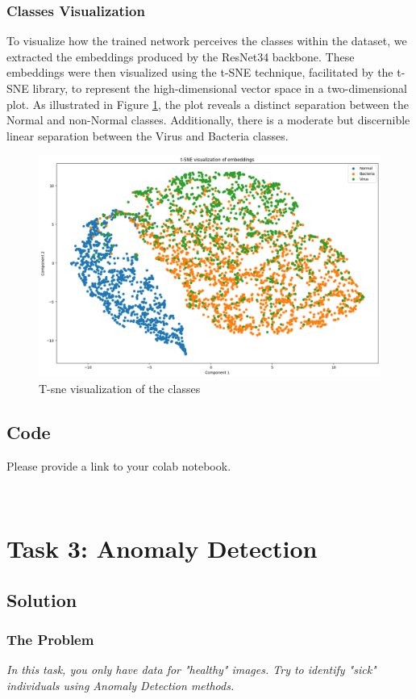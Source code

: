 \documentclass{article}
\begin{document}
\subsubsection{Classes Visualization}
To visualize how the trained network perceives the classes within the dataset, we extracted the embeddings produced by the ResNet34 backbone. These embeddings were then visualized using the t-SNE technique, facilitated by the t-SNE library, to represent the high-dimensional vector space in a two-dimensional plot. As illustrated in Figure \ref{fig:t_sne_1b}, the plot reveals a distinct separation between the Normal and non-Normal classes. Additionally, there is a moderate but discernible linear separation between the Virus and Bacteria classes.

\begin{figure}
  \centering
  \includegraphics[width=0.55\linewidth, angle=0]{t_sne_1b.png}
  \caption{T-sne visualization of the classes}
  \label{fig:t_sne_1b}
\end{figure}

\subsection{Code}

Please provide a link to your colab notebook.


\
\section{Task 3: Anomaly Detection}

\subsection{Solution}

\subsubsection{The Problem}
\textit{In this task, you only have data for "healthy" images. Try to identify "sick" individuals using Anomaly Detection methods.}
\end{document}
